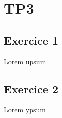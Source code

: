 \documentclass{article}
\begin{document}
\section{TP3}
\subsection{Exercice 1}
Lorem upsum

\subsection{Exercice 2}
Lorem ypsum
\end{document}
